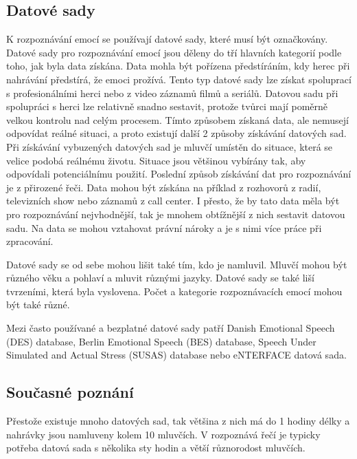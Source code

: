 \documentclass[FM,BP]{tulthesis}
\begin{document}
\subsection{Datové sady}
K rozpoznávání emocí se používají datové sady, které musí být označkovány. Datové sady pro rozpoznávání emocí jsou děleny do tří hlavních kategorií podle toho, jak byla data získána. Data mohla být pořízena předstíráním, kdy herec při nahrávání předstírá, že emoci prožívá. Tento typ datové sady lze získat spoluprací s profesionálními herci nebo z video záznamů filmů a seriálů. Datovou sadu při spolupráci s herci lze relativně snadno sestavit, protože tvůrci mají poměrně velkou kontrolu nad celým procesem. Tímto způsobem získaná data, ale nemusejí odpovídat reálné situaci, a proto existují další 2 způsoby získávání datových sad. Při získávání vybuzených datových sad je mluvčí umístěn do situace, která se velice podobá reálnému životu. Situace jsou většinou vybírány tak, aby odpovídali potenciálnímu použití\cite{konar_chakraborty_2015}. Poslední způsob získávání dat pro rozpoznávání je z přirozené řeči. Data mohou být získána na příklad z rozhovorů z radií, televizních show nebo záznamů z call center. I přesto, že by tato data měla být pro rozpoznávání nejvhodnější, tak je mnohem obtížnější z nich sestavit datovou sadu. Na data se mohou vztahovat právní nároky a je s nimi více práce při zpracování.\cite{DBLP:journals/speech/AkcayO20}

Datové sady se od sebe mohou lišit také tím, kdo je namluvil. Mluvčí mohou být různého věku a pohlaví a mluvit různými jazyky. Datové sady se také liší tvrzeními, která byla vyslovena. Počet a kategorie rozpoznávacích emocí mohou být také různé.\cite{DBLP:journals/speech/AkcayO20}

Mezi často používané a bezplatné datové sady patří Danish Emotional Speech (DES) database, Berlin Emotional Speech (BES) database, Speech Under Simulated and Actual Stress (SUSAS) database nebo eNTERFACE datová sada.\cite{konar_chakraborty_2015}

\subsection{Současné poznání}
Přestože existuje mnoho datových sad, tak většina z nich má do 1 hodiny délky a nahrávky jsou namluveny kolem 10 mluvčích. V rozpoznává řečí je typicky potřeba datová sada s několika sty hodin a větší různorodost mluvčích\cite{konar_chakraborty_2015}.
\end{document}
